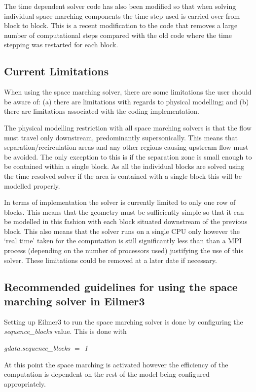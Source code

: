 The time dependent solver code has also been modified so that when solving individual space marching components the time step used is carried over from block to block. This is a recent modification to the code that removes a large number of computational steps compared with the old code where the time stepping was restarted for each block.

\subsection{Current Limitations}

When using the space marching solver, there are some limitations the user should be aware of: (a) there are limitations with regards to physical modelling; and (b) there are limitations associated with the coding implementation.

The physical modelling restriction with all space marching solvers is that the flow must travel only downstream, predominantly supersonically. This means that separation/recirculation areas and any other regions causing upstream flow must be avoided. The only exception to this is if the separation zone is small enough to be contained within a single block. As all the individual blocks are solved using the time resolved solver if the area is contained with a single block this will be modelled properly.

In terms of implementation the solver is currently limited to only one row of blocks. This means that the geometry must be sufficiently simple so that it can be modelled in this fashion with each block situated downstream of the previous block. This also means that the solver runs on a single CPU only however the `real time' taken for the computation is still significantly less than than a MPI process (depending on the number of processors used) justifying the use of this solver. These limitations could be removed at a later date if necessary.

\subsection{Recommended guidelines for using the space marching solver in Eilmer3}

Setting up Eilmer3 to run the space marching solver is done by configuring the \textit{sequence\_blocks} value. This is done with \newline
\centerline{\textit{gdata.sequence\_blocks $=$ 1}}
\newline
At this point the space marching is activated however the efficiency of the computation is dependent on the rest of the model being configured appropriately. 

